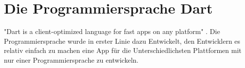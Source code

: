 \section{Die Programmiersprache Dart}
	"Dart is a client-optimized language for fast apps on any platform" \cite{b1}. Die Programmiersprache wurde in erster Linie dazu Entwickelt, den Entwicklern es relativ einfach zu machen eine App für die Unterschiedlichsten Plattformen mit nur einer Programmiersprache zu entwickeln.
